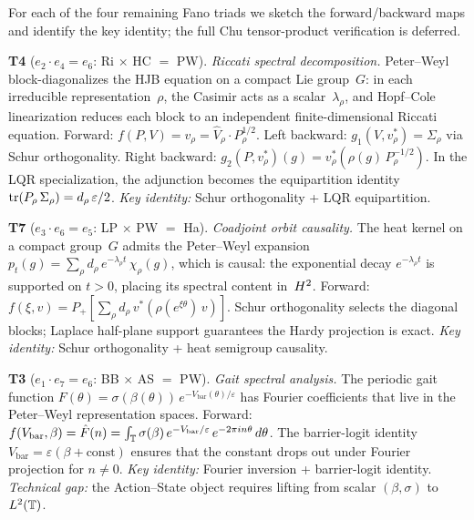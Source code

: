 \begin{remark}
\label{rmk:remaining-triads}
For each of the four remaining Fano triads we sketch the
forward/backward maps and identify the key identity; the
full Chu tensor-product verification is deferred.

\medskip\noindent
\textbf{T4}\; ($e_2 \cdot e_4 = e_6$: Ri $\times$ HC $=$ PW).
\emph{Riccati spectral decomposition.}\;
Peter--Weyl block-diagonalizes the HJB equation on a compact
Lie group~$G$: in each irreducible representation~$\rho$,
the Casimir acts as a scalar~$\lambda_\rho$, and Hopf--Cole
linearization reduces each block to an independent
finite-dimensional Riccati equation.
Forward: $f(P, V) = v_\rho = \hat{V}_\rho \cdot P_\rho^{1/2}$.
Left backward: $g_1(V, v_\rho^*) = \Sigma_\rho$ via Schur
orthogonality.
Right backward: $g_2(P, v_\rho^*)(g)
= v_\rho^*(\rho(g)\,P_\rho^{-1/2})$.
In the LQR specialization, the adjunction becomes the
equipartition identity
$\operatorname{tr}(P_\rho\,\Sigma_\rho) = d_\rho\,\varepsilon/2$.
\emph{Key identity:} Schur orthogonality + LQR equipartition.

\medskip\noindent
\textbf{T7}\; ($e_3 \cdot e_6 = e_5$: LP $\times$ PW $=$ Ha).
\emph{Coadjoint orbit causality.}\;
The heat kernel on a compact group~$G$ admits the
Peter--Weyl expansion
$p_t(g) = \sum_\rho d_\rho\, e^{-\lambda_\rho t}\,\chi_\rho(g)$,
which is causal: the exponential decay $e^{-\lambda_\rho t}$
is supported on $t > 0$, placing its spectral content in~$H^2$.
Forward: $f(\xi, v) = P_+[\sum_\rho d_\rho\,
  v^*(\rho(e^{\xi\theta})\,v)]$.
Schur orthogonality selects the diagonal blocks; Laplace
half-plane support guarantees the Hardy projection is exact.
\emph{Key identity:} Schur orthogonality +
heat semigroup causality.

\medskip\noindent
\textbf{T3}\; ($e_1 \cdot e_7 = e_6$: BB $\times$ AS $=$ PW).
\emph{Gait spectral analysis.}\;
The periodic gait function
$F(\theta) = \sigma(\beta(\theta))\,e^{-V_{\mathrm{bar}}(\theta)/\varepsilon}$
has Fourier coefficients that live in the Peter--Weyl
representation spaces.
Forward: $f(V_{\mathrm{bar}}, \beta) = \hat{F}(n)
= \int_{\mathbb{T}} \sigma(\beta)\,e^{-V_{\mathrm{bar}}/\varepsilon}\,
  e^{-2\pi i n\theta}\,d\theta$.
The barrier-logit identity
$V_{\mathrm{bar}} = \varepsilon(\beta + \mathrm{const})$
ensures that the constant drops out under Fourier projection
for $n \neq 0$.
\emph{Key identity:} Fourier inversion +
barrier-logit identity.
\emph{Technical gap:} the Action--State object requires
lifting from scalar $(\beta, \sigma)$ to $L^2(\mathbb{T})$.


\end{remark}
